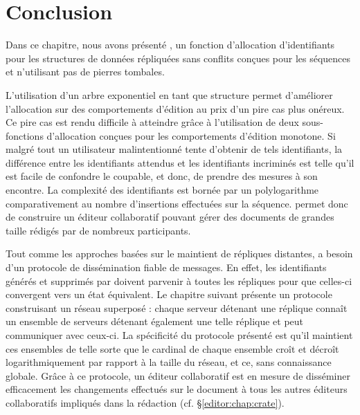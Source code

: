 
\section{Conclusion}
\label{repl:sec:conclusion}

Dans ce chapitre, nous avons présenté \LSEQ, un fonction d'allocation
d'identifiants pour les structures de données répliquées sans conflits conçues
pour les séquences et n'utilisant pas de pierres tombales.

L'utilisation d'un arbre exponentiel en tant que structure permet d'améliorer
l'allocation sur des comportements d'édition au prix d'un pire cas plus
onéreux. Ce pire cas est rendu difficile à atteindre grâce à l'utilisation de
deux sous-fonctions d'allocation conçues pour les comportements d'édition
monotone. Si malgré tout un utilisateur malintentionné tente d'obtenir de tels
identifiants, la différence entre les identifiants attendus et les identifiants
incriminés est telle qu'il est facile de confondre le coupable, et donc, de
prendre des mesures à son encontre. La complexité des identifiants \LSEQ est
bornée par un polylogarithme comparativement au nombre d'insertions effectuées
sur la séquence. \LSEQ permet donc de construire un éditeur collaboratif pouvant
gérer des documents de grandes taille rédigés par de nombreux participants.

Tout comme les approches basées sur le maintient de répliques distantes, \LSEQ a
besoin d'un protocole de dissémination fiable de messages. En effet, les
identifiants générés et supprimés par \LSEQ doivent parvenir à toutes les
répliques pour que celles-ci convergent vers un état équivalent.  Le chapitre
suivant présente un protocole construisant un réseau superposé : chaque serveur
détenant une réplique connaît un ensemble de serveurs détenant également une
telle réplique et peut communiquer avec ceux-ci. La spécificité du protocole
présenté est qu'il maintient ces ensembles de telle sorte que le cardinal de
chaque ensemble croît et décroît logarithmiquement par rapport à la taille du
réseau, et ce, sans connaissance globale. Grâce à ce protocole, un éditeur
collaboratif est en mesure de disséminer efficacement les changements effectués
sur le document à tous les autres éditeurs collaboratifs impliqués dans la
rédaction (cf. §\ref{editor:chap:crate}).


